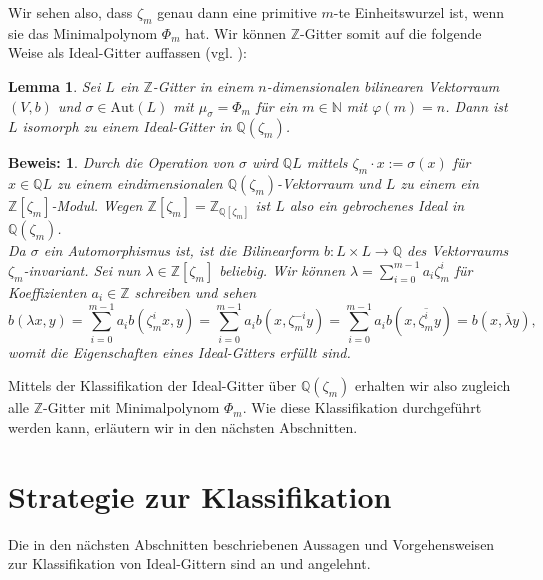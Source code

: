 \documentclass[12pt,a4paper,halfparskip,headsepline,bibtotocnumbered]{scrreprt}
\theoremstyle{nummermitklammern}
\newtheorem{lemma}[defsatzusw]{Lemma}
\theoremstyle{nonumberbreak}
\newtheorem{beweis}{Beweis:}
\newcommand{\N}{\mathbb{N}}
\newcommand{\Z}{\mathbb{Z}}
\newcommand{\Q}{\mathbb{Q}}
\begin{document}
Wir sehen also, dass $\zeta_m$ genau dann eine primitive $m$-te Einheitswurzel ist, wenn sie das Minimalpolynom $\Phi_m$ hat. Wir können $\Z$-Gitter somit auf die folgende Weise als Ideal-Gitter auffassen (vgl. \cite[Abschnitt (5.2)]{nebe}):

\begin{framed}
	\begin{lemma}\label{lem:ztoid}
		Sei $L$ ein $\Z$-Gitter in einem $n$-dimensionalen bilinearen Vektorraum $(V,b)$ und $\sigma \in \text{Aut}(L)$ mit $\mu_\sigma = \Phi_m$ für ein $m \in \N$ mit $\varphi(m) = n$. Dann ist $L$ isomorph zu einem Ideal-Gitter in $\Q \left( \zeta_m \right)$.
	\end{lemma}
\end{framed}

\begin{beweis}
	Durch die Operation von $\sigma$ wird $\Q L$ mittels $\zeta_m \cdot x := \sigma(x)$ für $x \in \Q L$ zu einem eindimensionalen $\Q \left( \zeta_m \right)$-Vektorraum und $L$ zu einem ein $\Z \left[ \zeta_m \right]$-Modul. Wegen $\Z \left[ \zeta_m \right] = \Z_{\Q\left[\zeta_m \right]}$ ist $L$ also ein gebrochenes Ideal in $\Q \left( \zeta_m \right)$.\\
	Da $\sigma$ ein Automorphismus ist, ist die Bilinearform $b:L \times L \rightarrow \Q$ des Vektorraums $\zeta_m$-invariant. Sei nun $\lambda \in \Z \left[ \zeta_m \right]$ beliebig. Wir können $\lambda = \sum_{i=0}^{m-1} a_i \zeta_m^i $ für Koeffizienten $a_i \in \Z$ schreiben und sehen
	\begin{equation*}
		b(\lambda x, y) = \sum_{i=0}^{m-1} a_i b(\zeta_m^i x, y) = \sum_{i=0}^{m-1} a_i b(x, \zeta_m^{-i} y) = \sum_{i=0}^{m-1} a_i b(x, \overline{\zeta_m^i} y) = b(x, \overline{\lambda} y),
	\end{equation*}
	womit die Eigenschaften eines Ideal-Gitters erfüllt sind.
\end{beweis}

Mittels der Klassifikation der Ideal-Gitter über $\Q(\zeta_m)$ erhalten wir also zugleich alle  $\Z$-Gitter mit Minimalpolynom $\Phi_m$. Wie diese Klassifikation durchgeführt werden kann, erläutern wir in den nächsten Abschnitten.

\section{Strategie zur Klassifikation}

Die in den nächsten Abschnitten beschriebenen Aussagen und Vorgehensweisen zur Klassifikation von Ideal-Gittern sind an \cite[Abschnitt (3.2)]{juergens} und \cite[Abschnitt (5.2)]{nebe} angelehnt.
\end{document}
